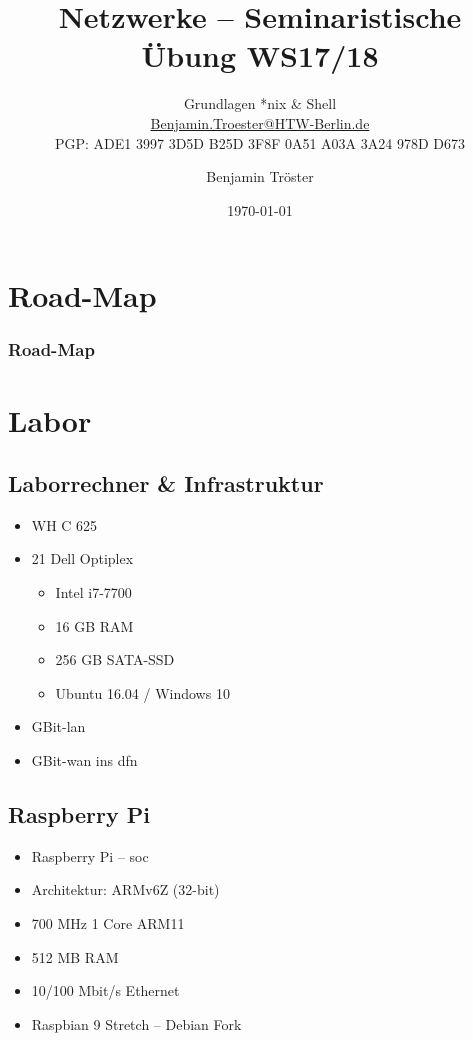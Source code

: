 \documentclass[xcolor=dvipsnames,aspectratio=169]{beamer}
\begin{document}

\title{Netzwerke -- Seminaristische Übung WS17/18}
\subtitle{Grundlagen *nix \& Shell\\
\href{mailto:Benjamin.Troester@HTW-Berlin.de}{Benjamin.Troester@HTW-Berlin.de}\\
		PGP: ADE1 3997 3D5D B25D 3F8F 0A51 A03A 3A24 978D D673 }
\author{Benjamin Tröster}

\date{\today}

\begin{frame}
\titlepage
\end{frame}

\section*{Road-Map}
\begin{frame}
\frametitle{Road-Map}
\begin{multicols}{2}
  \tableofcontents
\end{multicols}
\end{frame}

\section{Labor}
\subsection{Laborrechner \& Infrastruktur}
\begin{frame}
\begin{itemize}
	\item WH C 625
	\item 21 Dell Optiplex
	\begin{itemize}
		\item Intel i7-7700
		\item 16 GB RAM
		\item 256 GB SATA-SSD
		\item Ubuntu 16.04 / Windows 10
	\end{itemize}
	\item GBit-\ac{lan}
	\item GBit-\ac{wan} ins \ac{dfn}
\end{itemize}
\end{frame}

\subsection{Raspberry Pi}
\begin{frame}
\begin{itemize}
	\item Raspberry Pi -- \ac{soc}
	\item Architektur: ARMv6Z (32-bit)
	\item 700 MHz 1 Core  ARM11
	\item 512 MB RAM
	\item 10/100 Mbit/s Ethernet
	\item Raspbian 9 Stretch -- Debian Fork
\end{itemize}
\end{frame}
\end{document}
